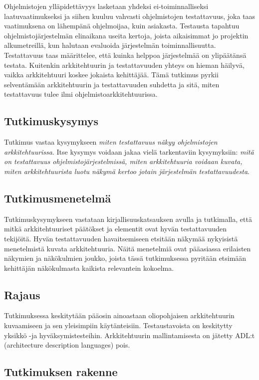 \documentclass[finnish]{tktltiki2}
\theoremstyle{definition}
\theoremstyle{remark}
\begin{document}
Ohjelmistojen ylläpidettävyys lasketaan yhdeksi ei-toiminnalliseksi laatuvaatimukseksi ja siihen kuuluu vahvasti ohjelmistojen testattavuus, joka taas vaatimuksena on lähempänä ohjelmoijaa, kuin asiakasta. Testausta tapahtuu ohjelmistojärjestelmän elinaikana useita kertoja, joista  aikaisimmat jo projektin alkumetreillä, kun halutaan evaluoida järjestelmän toiminnallisuutta. Testattavuus taas määrittelee, että kuinka helppoa järjestelmää on ylipäätänsä testata. Kuitenkin arkkitehtuurin ja testattavuuden yhteys on hieman häilyvä, vaikka arkkitehtuuri koskee jokaista kehittäjää. Tämä tutkimus pyrkii selventämään arkkitehtuurin ja testattavuuden suhdetta ja sitä, miten testattavuus tulee ilmi ohjelmistoarkkitehtuurissa. 

\subsection{Tutkimuskysymys}
Tutkimus vastaa kysymykseen \textit{miten testattavuus näkyy ohjelmistojen arkkitehtuurissa}. Itse kysymys voidaan jakaa vielä tarkentaviin kysymyksiin: \textit{mitä on testattavuus ohjelmistojärjestelmissä, miten arkkitehtuuria voidaan kuvata, miten arkkitehtuurista luotu näkymä kertoo jotain järjestelmän testattavuudesta}. 

\subsection{Tutkimusmenetelmä}
Tutkimuskysymykseen vastataan kirjallisuuskatsauksen avulla ja tutkimalla, että mitkä arkkitehtuuriset päätökset ja elementit ovat hyvän testattavuuden tekijöitä. Hyvän testattavuuden havaitsemiseen etsitään näkymää nykyisistä menetelmistä kuvata arkkitehtuuria. Näitä menetelmiä ovat pääasiassa erilaisten näkymien ja näkökulmien joukko, joista tässä tutkimuksessa pyritään etsimään kehittäjän näkökulmasta kaikista relevantein kokoelma.

\subsection{Rajaus}

Tutkimuksessa keskitytään pääosin ainoastaan oliopohjaisen arkkitehtuurin kuvaamiseen ja sen yleisimpiin käytänteisiin. Testaustavoista on keskitytty yksikkö -ja hyväksymistesteihin. Arkkitehtuurin mallintamisesta on jätetty ADL:t (architecture description languages) pois.

\subsection{Tutkimuksen rakenne}
\end{document}

